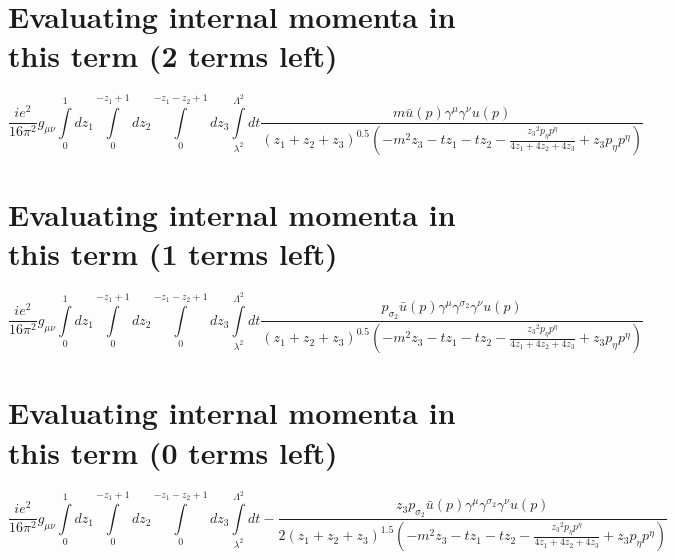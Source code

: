 \section*{Evaluating internal momenta in this term (2 terms left)}
\begin{dmath}\frac{i e^{2}}{16 \pi^{2}}g_{ \mu \nu }\int\limits_{ 0 }^{ 1 } d{ z_{ 1 } }\int\limits_{ 0 }^{ - { z_{ 1 } } + 1 } d{ z_{ 2 } }\int\limits_{ 0 }^{ - { z_{ 1 } } - { z_{ 2 } } + 1 } d{ z_{ 3 } }\int\limits_{ \lambda^{2} }^{ \Lambda^{2} } dt\frac{m { \bar{u}(p) } { \gamma^{ \mu } } { \gamma^{ \nu } } u({ p })}{\left({ z_{ 1 } } + { z_{ 2 } } + { z_{ 3 } }\right)^{0.5} \left(- m^{2} { z_{ 3 } } - t { z_{ 1 } } - t { z_{ 2 } } - \frac{{ z_{ 3 } }^{2} { { p }_{ \eta } } { { p }^{ \eta } }}{4 { z_{ 1 } } + 4 { z_{ 2 } } + 4 { z_{ 3 } }} + { z_{ 3 } } { { p }_{ \eta } } { { p }^{ \eta } }\right)}\end{dmath}
\section*{Evaluating internal momenta in this term (1 terms left)}
\begin{dmath}\frac{i e^{2}}{16 \pi^{2}}g_{ \mu \nu }\int\limits_{ 0 }^{ 1 } d{ z_{ 1 } }\int\limits_{ 0 }^{ - { z_{ 1 } } + 1 } d{ z_{ 2 } }\int\limits_{ 0 }^{ - { z_{ 1 } } - { z_{ 2 } } + 1 } d{ z_{ 3 } }\int\limits_{ \lambda^{2} }^{ \Lambda^{2} } dt\frac{{ { p }_{ \sigma_2 } } { \bar{u}(p) } { \gamma^{ \mu } } { \gamma^{ \sigma_2 } } { \gamma^{ \nu } } u({ p })}{\left({ z_{ 1 } } + { z_{ 2 } } + { z_{ 3 } }\right)^{0.5} \left(- m^{2} { z_{ 3 } } - t { z_{ 1 } } - t { z_{ 2 } } - \frac{{ z_{ 3 } }^{2} { { p }_{ \eta } } { { p }^{ \eta } }}{4 { z_{ 1 } } + 4 { z_{ 2 } } + 4 { z_{ 3 } }} + { z_{ 3 } } { { p }_{ \eta } } { { p }^{ \eta } }\right)}\end{dmath}
\section*{Evaluating internal momenta in this term (0 terms left)}
\begin{dmath}\frac{i e^{2}}{16 \pi^{2}}g_{ \mu \nu }\int\limits_{ 0 }^{ 1 } d{ z_{ 1 } }\int\limits_{ 0 }^{ - { z_{ 1 } } + 1 } d{ z_{ 2 } }\int\limits_{ 0 }^{ - { z_{ 1 } } - { z_{ 2 } } + 1 } d{ z_{ 3 } }\int\limits_{ \lambda^{2} }^{ \Lambda^{2} } dt- \frac{{ z_{ 3 } } { { p }_{ \sigma_2 } } { \bar{u}(p) } { \gamma^{ \mu } } { \gamma^{ \sigma_2 } } { \gamma^{ \nu } } u({ p })}{2 \left({ z_{ 1 } } + { z_{ 2 } } + { z_{ 3 } }\right)^{1.5} \left(- m^{2} { z_{ 3 } } - t { z_{ 1 } } - t { z_{ 2 } } - \frac{{ z_{ 3 } }^{2} { { p }_{ \eta } } { { p }^{ \eta } }}{4 { z_{ 1 } } + 4 { z_{ 2 } } + 4 { z_{ 3 } }} + { z_{ 3 } } { { p }_{ \eta } } { { p }^{ \eta } }\right)}\end{dmath}
